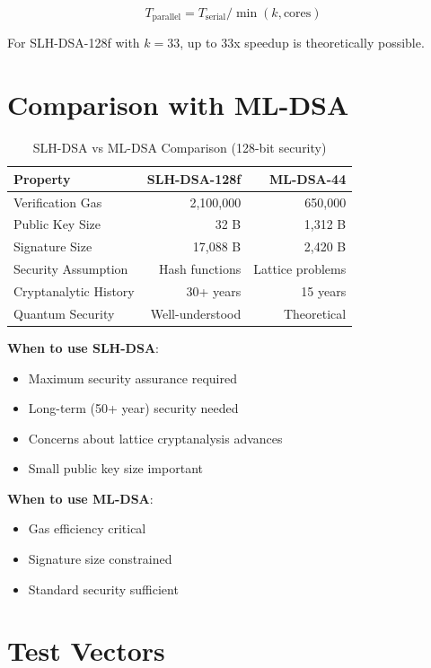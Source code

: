 \documentclass[11pt,a4paper]{article}
\begin{document}
\begin{equation}
T_{\text{parallel}} = T_{\text{serial}} / \min(k, \text{cores})
\end{equation}

For SLH-DSA-128f with $k=33$, up to 33x speedup is theoretically possible.

\section{Comparison with ML-DSA}

\begin{table}[htbp]
\centering
\caption{SLH-DSA vs ML-DSA Comparison (128-bit security)}
\label{tab:comparison}
\begin{tabular}{@{}lrr@{}}
\toprule
Property & SLH-DSA-128f & ML-DSA-44 \\
\midrule
Verification Gas & 2,100,000 & 650,000 \\
Public Key Size & 32 B & 1,312 B \\
Signature Size & 17,088 B & 2,420 B \\
Security Assumption & Hash functions & Lattice problems \\
Cryptanalytic History & 30+ years & 15 years \\
Quantum Security & Well-understood & Theoretical \\
\bottomrule
\end{tabular}
\end{table}

\textbf{When to use SLH-DSA}:
\begin{itemize}
    \item Maximum security assurance required
    \item Long-term (50+ year) security needed
    \item Concerns about lattice cryptanalysis advances
    \item Small public key size important
\end{itemize}

\textbf{When to use ML-DSA}:
\begin{itemize}
    \item Gas efficiency critical
    \item Signature size constrained
    \item Standard security sufficient
\end{itemize}

\section{Test Vectors}
\end{document}
